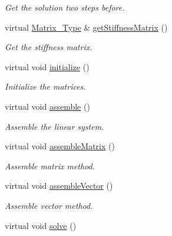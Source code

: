 \begin{DoxyCompactItemize}
\begin{DoxyCompactList}\small\item\em Get the solution two steps before. \end{DoxyCompactList}\item 
virtual \hyperlink{classFVCode3D_1_1DarcyPseudoSteady_3_01QRMatrix_00_01QRFracture_00_01MatrixType_00_01BDF2_01_4_a81a6ca6f572760bbfc094ade854ae054}{Matrix\+\_\+\+Type} \& \hyperlink{classFVCode3D_1_1DarcyPseudoSteady_3_01QRMatrix_00_01QRFracture_00_01MatrixType_00_01BDF2_01_4_aaac4fca6ca6bffb3cc0942778c711e19}{get\+Stiffness\+Matrix} ()
\begin{DoxyCompactList}\small\item\em Get the stiffness matrix. \end{DoxyCompactList}\item 
virtual void \hyperlink{classFVCode3D_1_1DarcyPseudoSteady_3_01QRMatrix_00_01QRFracture_00_01MatrixType_00_01BDF2_01_4_a7e0e4eeb55c7fce3f1968d29a430152f}{initialize} ()
\begin{DoxyCompactList}\small\item\em Initialize the matrices. \end{DoxyCompactList}\item 
virtual void \hyperlink{classFVCode3D_1_1DarcyPseudoSteady_3_01QRMatrix_00_01QRFracture_00_01MatrixType_00_01BDF2_01_4_a5026cafc64baea6f01592fdb440ff60d}{assemble} ()
\begin{DoxyCompactList}\small\item\em Assemble the linear system. \end{DoxyCompactList}\item 
virtual void \hyperlink{classFVCode3D_1_1DarcyPseudoSteady_3_01QRMatrix_00_01QRFracture_00_01MatrixType_00_01BDF2_01_4_a1dfbfca954ed3873efcfb21c7ff42875}{assemble\+Matrix} ()
\begin{DoxyCompactList}\small\item\em Assemble matrix method. \end{DoxyCompactList}\item 
virtual void \hyperlink{classFVCode3D_1_1DarcyPseudoSteady_3_01QRMatrix_00_01QRFracture_00_01MatrixType_00_01BDF2_01_4_a9c4260f6d5d17c797435cbb4d0fbed47}{assemble\+Vector} ()
\begin{DoxyCompactList}\small\item\em Assemble vector method. \end{DoxyCompactList}\item 
virtual void \hyperlink{classFVCode3D_1_1DarcyPseudoSteady_3_01QRMatrix_00_01QRFracture_00_01MatrixType_00_01BDF2_01_4_a4b0a1521154a61420ef1bc0506d65ae5}{solve} ()

\end{DoxyCompactItemize}
